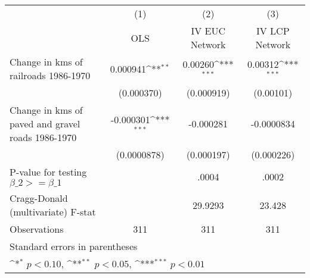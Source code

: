 {
\def\sym#1{\ifmmode^{#1}\else\(^{#1}\)\fi}
\begin{tabular}{l*{3}{c}}
\hline\hline
                &\multicolumn{1}{c}{(1)}&\multicolumn{1}{c}{(2)}&\multicolumn{1}{c}{(3)}\\
                &\multicolumn{1}{c}{OLS}&\multicolumn{1}{c}{IV EUC Network}&\multicolumn{1}{c}{IV LCP Network}\\
\hline
Change in kms of railroads 1986-1970& 0.000941\sym{**} &  0.00260\sym{***}&  0.00312\sym{***}\\
                &(0.000370)         &(0.000919)         &(0.00101)         \\
[1em]
Change in kms of paved and gravel roads 1986-1970&-0.000301\sym{***}&-0.000281         &-0.0000834         \\
                &(0.0000878)         &(0.000197)         &(0.000226)         \\
\hline
P-value for testing $\beta\_{2} >= \beta\_{1}$&                  &    .0004         &    .0002         \\
Cragg-Donald (multivariate) F-stat&                  &  29.9293         &   23.428         \\
Observations    &      311         &      311         &      311         \\
\hline\hline
\multicolumn{4}{l}{\footnotesize Standard errors in parentheses}\\
\multicolumn{4}{l}{\footnotesize \sym{*} \(p<0.10\), \sym{**} \(p<0.05\), \sym{***} \(p<0.01\)}\\
\end{tabular}
}
